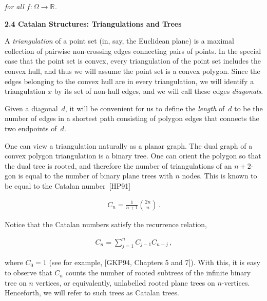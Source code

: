 \documentclass[10pt,a4paper]{article}
\begin{document}
\emph{for all $f:\Omega\to\mathbb{R}$.}\par







\par\medskip\noindent\textbf{2.4 Catalan Structures: Triangulations and Trees}\par




A \emph{triangulation} of a point set (in, say, the Euclidean plane) is a maximal collection of pairwise non-crossing edges connecting pairs of points. In the special case that the point set is convex, every triangulation of the point set includes the convex hull, and thus we will assume the point set is a convex polygon. Since the edges belonging to the convex hull are in every triangulation, we will identify a triangulation $x$ by its set of non-hull edges, and we will call these edges \emph{diagonals}.\par




Given a diagonal $d$, it will be convenient for us to define the \emph{length} of $d$ to be the number of edges in a shortest path consisting of polygon edges that connects the two endpoints of $d$.\par




One can view a triangulation naturally as a planar graph. The dual graph of a convex polygon triangulation is a binary tree. One can orient the polygon so that the dual tree is rooted, and therefore the number of triangulations of an $n+2$-gon is equal to the number of binary plane trees with $n$ nodes. This is known to be equal to the Catalan number [HP91]\par




\[\begin{gathered}
C_{n}=\frac{1}{n+1}\binom{2n}{n}\,.
\end{gathered}\]




Notice that the Catalan numbers satisfy the recurrence relation,\par


\[\begin{gathered}
C_{n}=\sum_{j=1}^{n}C_{j-1}C_{n-j}\,,
\end{gathered}\]


where $C_{0}=1$ (see for example, [GKP94, Chapters 5 and 7]). With this, it is easy to observe that $C_{n}$ counts the number of rooted subtrees of the infinite binary tree on $n$ vertices, or equivalently, unlabelled rooted plane trees on $n$-vertices. Henceforth, we will refer to such trees as Catalan trees.\par
\end{document}
